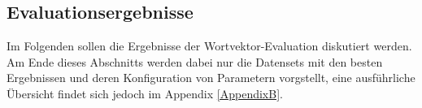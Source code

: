   \subsection{Evaluationsergebnisse}

  Im Folgenden sollen die Ergebnisse der Wortvektor-Evaluation diskutiert werden. Am Ende dieses Abschnitts werden dabei
  nur die Datensets mit den besten Ergebnissen und deren Konfiguration von Parametern vorgstellt, eine ausführliche
  Übersicht findet sich jedoch im Appendix \ref{AppendixB}.\\


